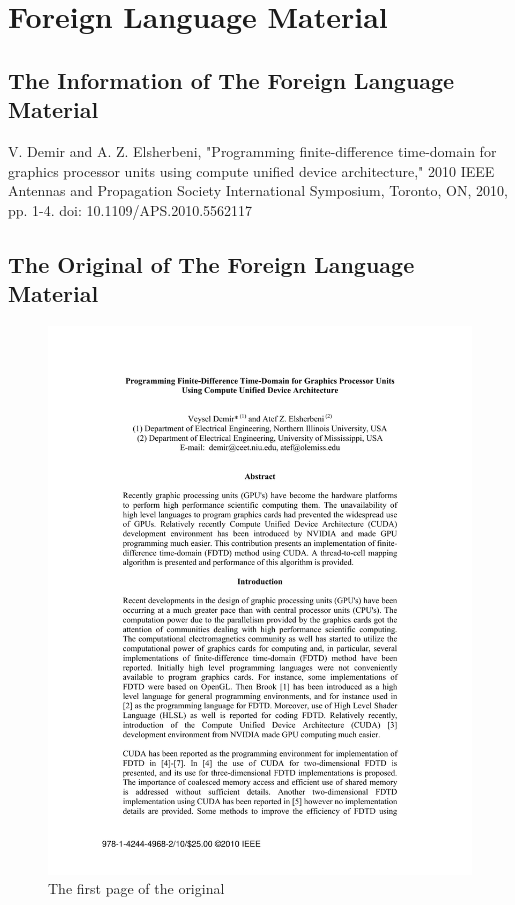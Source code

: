 
\chapter{Foreign Language Material}

\section{The Information of The Foreign Language Material}
V. Demir and A. Z. Elsherbeni, "Programming finite-difference time-domain for graphics processor units using compute unified device architecture," 2010 IEEE Antennas and Propagation Society International Symposium, Toronto, ON, 2010, pp. 1-4. doi: 10.1109/APS.2010.5562117

\section{The Original of The Foreign Language Material}

\begin{figure}[h]
\centering
\includegraphics[width=1\linewidth,height=0.8\textheight]{../pics/p01}
\caption{The first page of the original}
\label{fig:p01}
\end{figure}


